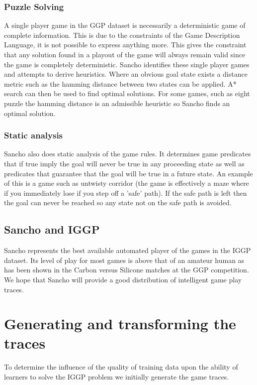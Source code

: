 \subsubsection{Puzzle Solving}
A single player game in the GGP dataset is necessarily a deterministic game of complete information. This is due to the constraints of the Game Description Language, it is not possible to express anything more. This gives the constraint that any solution found in a playout of the game will always remain valid since the game is completely deterministic. Sancho identifies these single player games and attempts to derive heuristics. Where an obvious goal state exists a distance metric such as the hamming distance between two states can be applied. A* search can then be used to find optimal solutions. For some games, such as eight puzzle the hamming distance is an admissible heuristic so Sancho finds an optimal solution.

\subsubsection{Static analysis}

Sancho also does static analysis of the game rules. It determines game predicates that if true imply the goal will never be true in any proceeding state as well as predicates that guarantee that the goal will be true in a future state. An example of this is a game such as untwisty corridor (the game is effectively a maze where if you immediately lose if you step off a 'safe' path). If the safe path is left then the goal can never be reached so any state not on the safe path is avoided.

\subsection{Sancho and IGGP}
Sancho represents the best available automated player of the games in the IGGP dataset. Its level of play for most games is above that of an amateur human as has been shown in the Carbon versus Silicone matches at the GGP competition\cite{Genesereth/GGPOverview}. We hope that Sancho will provide a good distribution of intelligent game play traces. 


\section{Generating and transforming the traces}
To determine the influence of the quality of training data upon the ability of learners to solve the IGGP problem we initially generate the game traces.

